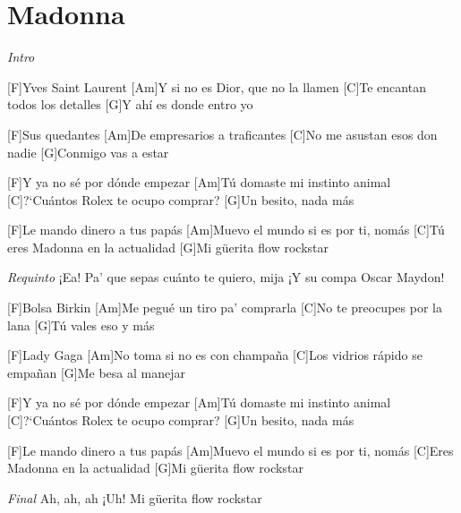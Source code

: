 \section{Madonna}

\noindent
\vspace{1cm}

\begin{guitar}
	\begin{multicols}{2}

		\textit{Intro}
		\par

		[F]Yves Saint Laurent
		[Am]Y si no es Dior, que no la llamen
		[C]Te encantan todos los detalles
		[G]Y ahí es donde entro yo

		[F]Sus quedantes
		[Am]De empresarios a traficantes
		[C]No me asustan esos don nadie
		[G]Conmigo vas a estar

		[F]Y ya no sé por dónde empezar
		[Am]Tú domaste mi instinto animal
		[C]?`Cuántos Rolex te ocupo comprar?
		[G]Un besito, nada más

		[F]Le mando dinero a tus papás
		[Am]Muevo el mundo si es por ti, nomás
		[C]Tú eres Madonna en la actualidad
		[G]Mi güerita flow rockstar

		\textit{Requinto}
		¡Ea!
		Pa' que sepas cuánto te quiero, mija
		¡Y su compa Oscar Maydon!

		[F]Bolsa Birkin
		[Am]Me pegué un tiro pa' comprarla
		[C]No te preocupes por la lana
		[G]Tú vales eso y más

		[F]Lady Gaga
		[Am]No toma si no es con champaña
		[C]Los vidrios rápido se empañan
		[G]Me besa al manejar

		[F]Y ya no sé por dónde empezar
		[Am]Tú domaste mi instinto animal
		[C]?`Cuántos Rolex te ocupo comprar?
		[G]Un besito, nada más

		[F]Le mando dinero a tus papás
		[Am]Muevo el mundo si es por ti, nomás
		[C]Eres Madonna en la actualidad
		[G]Mi güerita flow rockstar

		\textit{Final}
		Ah, ah, ah
		¡Uh!
		Mi güerita flow rockstar
	\end{multicols}
\end{guitar}
